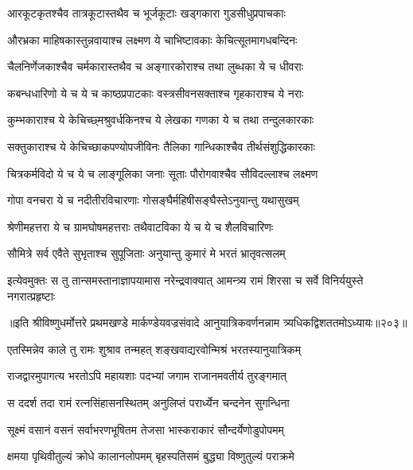 \twolineshloka
{आरकूटकृतश्चैव तात्रकूटास्तथैव च}
{भूर्जकूटाः खड्गकारा गुडसीधुप्रपाचकाः}%

\twolineshloka
{औरभ्रका माहिषकास्तुन्नवायाश्च लक्ष्मण}
{ये चाभिष्टावकाः केचित्सूतमागधबन्दिनः}%

\twolineshloka
{चैलनिर्णेजकाश्चैव चर्मकारास्तथैव च}
{अङ्गारकोराश्च तथा लुब्धका ये च धीवराः}%

\twolineshloka
{कबन्धधारिणो ये च ये च काष्ठप्रपाटकाः}
{वस्त्रसीवनसक्ताश्च गृहकाराश्च ये नराः}%

\twolineshloka
{कुम्भकाराश्च ये केचिच्छ्मश्रुवर्धकिनश्च ये}
{लेखका गणका ये च तथा तन्दुलकारकाः}%

\twolineshloka
{सक्तुकाराश्च ये केचिच्छाकपण्योपजीविनः}
{तैलिका गान्धिकाश्चैव तीर्थसंशुद्धिकारकाः}%

\twolineshloka
{चित्रकर्मविदो ये च ये च लाङ्गूलिका जनाः}
{सूताः पौरोगवाश्चैव सौविदल्लाश्च लक्ष्मण}%

\twolineshloka
{गोपा वनचरा ये च नदीतीरविचारणाः}
{गोसङ्घैर्महिषीसङ्घैस्तेऽनुयान्तु यथासुखम्}%

\twolineshloka
{श्रेणीमहत्तरा ये च ग्रामघोषमहत्तराः}
{तथैवाटविका ये च ये च शैलविचारिणः}%

\twolineshloka
{सौमित्रे सर्व एवैते सुभृताश्च सुपूजिताः}
{अनुयान्तु कुमारं मे भरतं भ्रातृवत्सलम्}%

\twolineshloka
{इत्येवमुक्तः स तु तान्समस्तानाज्ञापयामास नरेन्द्रवाक्यात्}
{आमन्त्र्य रामं शिरसा च सर्वे विनिर्ययुस्ते नगरात्प्रहृष्टाः}%

॥इति श्रीविष्णुधर्मोत्तरे प्रथमखण्डे मार्कण्डेयवज्रसंवादे आनुयात्रिकवर्णनन्नाम त्र्यधिकद्विशततमोऽध्यायः॥२०३॥



\twolineshloka
{एतस्मिन्नेव काले तु रामः शुश्राव तन्महत्}
{शङ्खवाद्यरवोन्मिश्रं भरतस्यानुयात्रिकम्}%

\twolineshloka
{राजद्वारमुपागत्य भरतोऽपि महायशाः}
{पदभ्यां जगाम राजानमवतीर्य तुरङ्गमात्}%

\twolineshloka
{स ददर्श तदा रामं रत्नसिंहासनस्थितम्}
{अनुलिप्तं परार्ध्येन चन्दनेन सुगन्धिना}%

\twolineshloka
{सूक्ष्मं वसानं वसनं सर्वाभरणभूषितम}
{तेजसा भास्कराकारं सौन्दर्येणोडुपोपमम्}%

\twolineshloka
{क्षमया पृथिवीतुल्यं क्रोधे कालानलोपमम्}
{बृहस्पतिसमं बुद्ध्या विष्णुतुल्यं पराक्रमे}%

